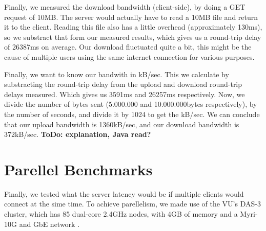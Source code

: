 Finally, we measured the download bandwidth (client-side), by doing a GET
request of 10MB. The server would actually have to read a 10MB file and return
it to the client. Reading this file also has a little overhead (approximately
130ms), so we substract that form our measured results, which gives us a
round-trip delay of 26387ms on average. Our download fluctuated quite a bit,
this might be the cause of multiple users using the same internet connection
for various purposes.

Finally, we want to know our bandwith in kB/sec. This we calculate by
substracting the round-trip delay from the upload and download round-trip delays
measured. Which gives us 3591ms and 26257ms respectively. Now, we divide the
number of bytes sent (5.000.000 and 10.000.000bytes respectively), by the number
of seconds, and divide it by 1024 to get the kB/sec. We can conclude that our
upload bandwidth is 1360kB/sec, and our download bandwidth is 372kB/sec.
\textbf{ToDo: explanation, Java read?}

\section{Parellel Benchmarks}
Finally, we tested what the server latency would be if multiple clients would
connect at the sime time. To achieve parellelism, we made use of the VU's DAS-3
cluster, which has 85 dual-core 2.4GHz nodes, with 4GB of memory and a Myri-10G
and GbE network \cite{das3-www}.

